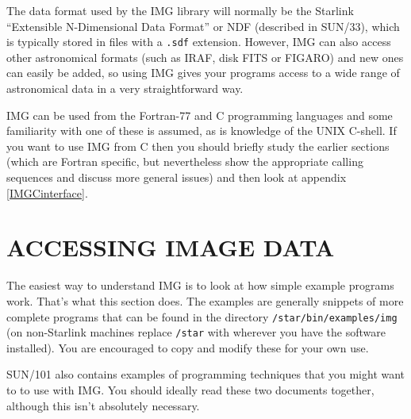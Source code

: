 \documentclass[twoside,11pt]{article}
\newcommand{\htmladdnormallink}[2]{#1}
\newcommand{\hyperref}[4]{#2\ref{#4}#3}
\newcommand{\htmlref}[2]{#1}
\newcommand{\xref}[3]{#1}
\renewcommand{\_}{\texttt{\symbol{95}}}
\newcommand{\myverb}[1]{{\texttt{#1}}}
\begin{document}
The data format used by the IMG library will normally be the Starlink
``Extensible N-Dimensional Data Format'' or NDF (described in
\xref{SUN/33}{sun33}{}), which is typically stored in files with a
\myverb{.sdf} extension.  However, IMG can also \htmlref{access other
astronomical formats}{IMGFOREIGNDATAFORMATS} (such as IRAF, disk FITS
or FIGARO) and new ones can easily be added, so using IMG gives your
programs access to a wide range of astronomical data in a very
straightforward way.

IMG can be used from the Fortran-77 and C programming languages and some
familiarity with one of these is assumed, as is knowledge of
the UNIX C-shell. If you want to use IMG from C then you should
briefly study the earlier sections (which are Fortran specific, but
nevertheless show the appropriate calling sequences and discuss more
general issues) and then look at 
\hyperref{this later section}{appendix }{}{IMGCinterface}.

\section{ACCESSING IMAGE DATA \label{USINGIMG}}
The easiest way to understand IMG is to look at how simple example
programs work. That's what this section does. The examples are generally
snippets of more complete programs that can be found in the
directory
\htmladdnormallink{\myverb{/star/bin/examples/img}}{../../bin/examples/img}
(on non-Starlink machines replace \myverb{/star} with wherever you
have the software installed).  You are encouraged to copy and modify
these for your own use.

\xref{SUN/101}{sun101}{} also contains examples of programming
techniques that you might want to to use with IMG. You should ideally
read these two documents together, although this isn't absolutely
necessary.
\end{document}
